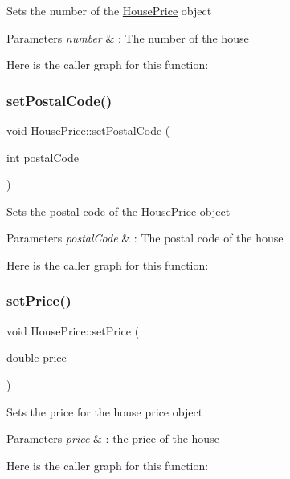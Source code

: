 Sets the number of the \hyperlink{class_house_price}{House\+Price} object 
\begin{DoxyParams}{Parameters}
{\em number} & \+: The number of the house \\
\hline
\end{DoxyParams}
Here is the caller graph for this function\+:
\mbox{\label{class_house_price_aee2efd36013264908af85bb5557eb9f2}} 
\subsubsection{\texorpdfstring{set\+Postal\+Code()}{setPostalCode()}}
{\footnotesize\ttfamily void House\+Price\+::set\+Postal\+Code (\begin{DoxyParamCaption}\item[{int}]{postal\+Code }\end{DoxyParamCaption})}

Sets the postal code of the \hyperlink{class_house_price}{House\+Price} object 
\begin{DoxyParams}{Parameters}
{\em postal\+Code} & \+: The postal code of the house \\
\hline
\end{DoxyParams}
Here is the caller graph for this function\+:
\mbox{\label{class_house_price_a1a25700daee1c9e740fb265195f167c9}} 
\subsubsection{\texorpdfstring{set\+Price()}{setPrice()}}
{\footnotesize\ttfamily void House\+Price\+::set\+Price (\begin{DoxyParamCaption}\item[{double}]{price }\end{DoxyParamCaption})}

Sets the price for the house price object 
\begin{DoxyParams}{Parameters}
{\em price} & \+: the price of the house \\
\hline
\end{DoxyParams}
Here is the caller graph for this function\+:
\mbox{\label{class_house_price_af53f5b0954fdea830d241f7a5354464c}} 
